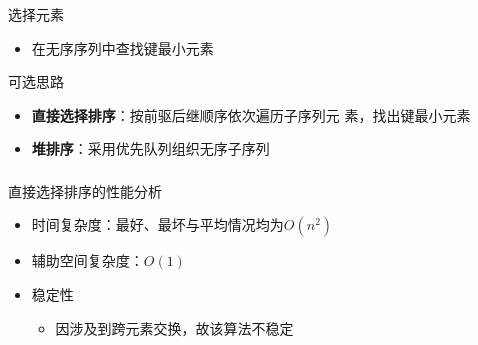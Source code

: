 \begin{frame}
    \frametitle{\insertsectionhead}
    \begin{block}{选择元素}
        \begin{itemize}
            \item 在\alert{无序序列}中\alert{查找}键最小元素
        \end{itemize}
    \end{block}
    \begin{block}{可选思路}
        \begin{itemize}
            \item \textbf{直接选择排序}：按前驱后继顺序依次遍历子序列元
                  素，\alert{找出}键最小元素
            \item \textbf{堆排序}：采用\alert{优先队列}组织无序子序列
        \end{itemize}
    \end{block}
\end{frame}

\begin{frame}
    \frametitle{\insertsectionhead}
    \begin{block}{直接选择排序的性能分析}
        \begin{itemize}
            \item 时间复杂度：最好、最坏与平均情况均为$O(n^{2})$
            \item 辅助空间复杂度：$O(1)$
            \item 稳定性
            \begin{itemize}
                \item 因涉及到跨元素交换，故该算法\alert{不稳定}
            \end{itemize}
        \end{itemize}
    \end{block}
\end{frame}



